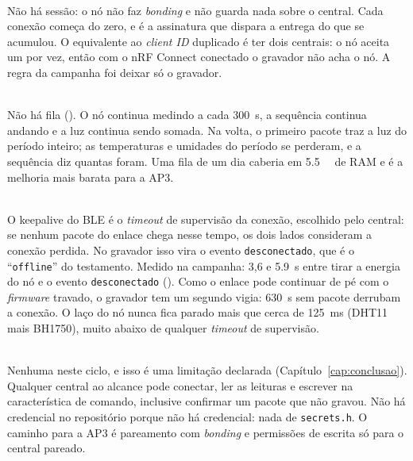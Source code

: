 \begin{description}[style=unboxed, leftmargin=0pt, font=\normalfont\bfseries]
  \item[1. Sessão persistente ou limpa, no nó e no gravador.]\hfill\\
    Não há sessão: o nó não faz \emph{bonding} e não guarda nada sobre o
    central. Cada conexão começa do zero, e é a assinatura que dispara a
    entrega do que se acumulou. O equivalente ao \emph{client ID}
    duplicado é ter dois centrais: o nó aceita um por vez, então com o
    nRF Connect conectado o gravador não acha o nó. A regra da campanha
    foi deixar só o gravador.
  \item[2. O que o nó faz com as leituras quando o central está fora de alcance.]\hfill\\
    Não há fila (). O nó continua medindo a cada
    \SI{300}{\second}, a sequência continua andando e a luz continua sendo
    somada. Na volta, o primeiro pacote traz a luz do período inteiro; as
    temperaturas e umidades do período se perderam, e a sequência diz
    quantas foram. Uma fila de um dia caberia em \SI{5.5}{\kilo\byte} de
    RAM e é a melhoria mais barata para a AP3.
  \item[3. Keepalive e testamento.]\hfill\\
    O keepalive do BLE é o \emph{timeout} de supervisão da conexão,
    escolhido pelo central: se nenhum pacote do enlace chega nesse tempo,
    os dois lados consideram a conexão perdida. No gravador isso vira o
    evento \texttt{desconectado}, que é o \enquote{\texttt{offline}} do
    testamento. Medido na campanha: 3,6 e \SI{5.9}{\second} entre tirar
    a energia do nó e o evento \texttt{desconectado} (). Como o enlace pode continuar
    de pé com o \emph{firmware} travado, o gravador tem um segundo vigia:
    \SI{630}{\second} sem pacote derrubam a conexão. O laço do nó nunca
    fica parado mais que cerca de \SI{125}{\milli\second} (DHT11 mais
    BH1750), muito abaixo de qualquer \emph{timeout} de supervisão.
  \item[4. Segurança mínima.]\hfill\\
    Nenhuma neste ciclo, e isso é uma limitação declarada
    (Capítulo~\ref{cap:conclusao}). Qualquer central ao alcance pode
    conectar, ler as leituras e escrever na característica de comando,
    inclusive confirmar um pacote que não gravou. Não há credencial no
    repositório porque não há credencial: nada de \texttt{secrets.h}. O
    caminho para a AP3 é pareamento com \emph{bonding} e permissões de
    escrita só para o central pareado.
\end{description}

